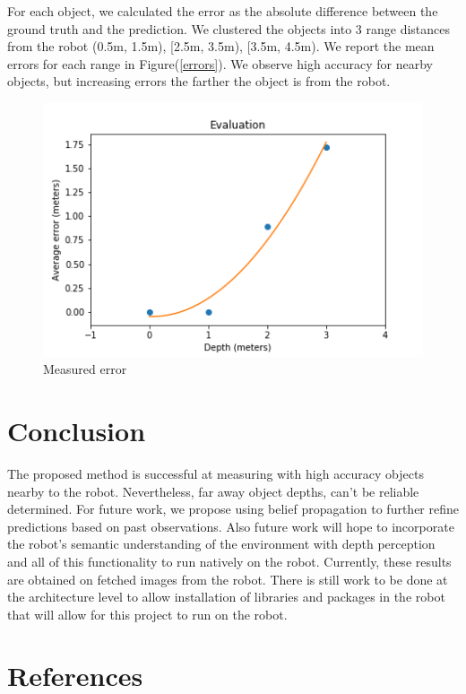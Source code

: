 \documentclass[12pt,letterpaper]{article}
\begin{document}
For each object, we calculated the error as the absolute difference between the ground truth and the prediction. We clustered the objects into 3 range distances from the robot (0.5m, 1.5m), [2.5m, 3.5m), [3.5m, 4.5m). We report the mean errors for each range in Figure(\ref{errors}). We observe high accuracy for nearby objects, but increasing errors the farther the object is from the robot.

\begin{figure}[h]
	\centering
	\includegraphics[width=0.7\linewidth]{./images/errors.png}
	\caption{Measured error }
\end{figure}

\section{Conclusion}
The proposed method is successful at measuring with high accuracy objects nearby to the robot. Nevertheless, far away object depths, can't be reliable determined. For future work, we propose using belief propagation to further refine predictions based on past observations. Also future work will hope to incorporate the robot's semantic understanding of the environment with depth perception and all of this functionality to run natively on the robot. Currently, these results are obtained on fetched images from the robot. There is still work to be done at the architecture level to allow installation of libraries and packages in the robot that will allow for this project to run on the robot.

\section{References}

%

\end{document}
